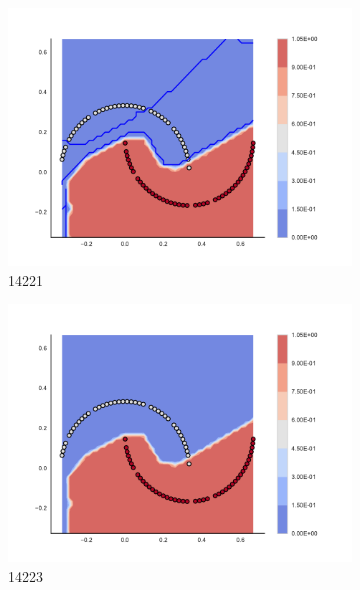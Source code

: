 \begin{figure}[h]
\begin{subfigure}[b]{0.09\textwidth}
    \includegraphics[clip, trim=2.35cm 1.75cm 4.5cm 0cm,width=\textwidth]{img/convergence/14221.pdf}
    \caption{14221}
    \label{fig:convergence_14221}
\end{subfigure}
%
\begin{subfigure}[b]{0.09\textwidth}
    \includegraphics[clip, trim=2.35cm 1.75cm 4.5cm 0cm,width=\textwidth]{img/convergence/14223.pdf}
    \caption{14223}
    \label{fig:convergence_14223}
\end{subfigure}
%
\begin{subfigure}[b]{0.09\textwidth}

\end{subfigure}
\end{figure}
